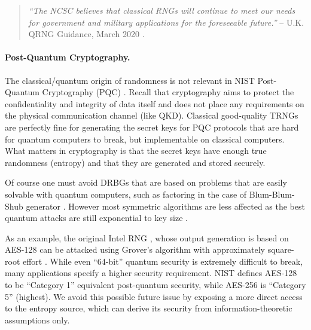     \begin{quote}
        {\it ``The NCSC believes that classical RNGs will continue to
        meet our needs for government and military applications for the
        foreseeable future.''}
        \flushright -- U.K. QRNG Guidance, March 2020 \cite{NC20}.
    \end{quote}

    \paragraph{Post-Quantum Cryptography.}
    The classical/quantum origin of randomness is not relevant in NIST
    Post-Quantum Cryptography (PQC) \cite{NI16}. Recall that cryptography
    aims to protect the confidentiality and integrity of data itself
    and does not place any requirements on the physical communication
    channel (like QKD). Classical good-quality TRNGs are perfectly fine
    for generating the secret keys for PQC protocols that are hard for
    quantum computers to break, but implementable on classical computers.
    What matters in cryptography is that the secret keys have enough true
    randomness (entropy) and that they are generated and stored securely.

    Of course one must avoid DRBGs that are based on problems that are
    easily solvable with quantum computers, such as factoring \cite{Sh94}
    in the case of Blum-Blum-Shub generator \cite{BlBlSh86}. However
    most symmetric algorithms are less affected as the best quantum
    attacks are still exponential to key size \cite{Gr96}.

    As an example, the original Intel RNG \cite{Me18}, whose output
    generation is based on AES-128 can be attacked using Grover's algorithm
    with approximately square-root effort \cite{JaNaRo+20}.
    While even ``64-bit'' quantum security is extremely difficult to
    break, many applications specify a higher security requirement.
    NIST \cite{NI16} defines AES-128 to be ``Category 1'' equivalent
    post-quantum security, while AES-256 is ``Category 5'' (highest).
    We avoid this possible future issue by exposing a more direct access
    to the entropy source, which can derive its security from
    information-theoretic assumptions only.



